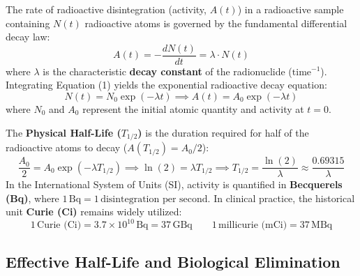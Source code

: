 \documentclass[11pt,a4paper]{article}
\begin{document}
The rate of radioactive disintegration (activity, $A(t)$) in a radioactive sample containing $N(t)$ radioactive atoms is governed by the fundamental differential decay law:
\begin{equation}
    A(t) = -\frac{dN(t)}{dt} = \lambda \cdot N(t)
\end{equation}
where $\lambda$ is the characteristic \textbf{decay constant} of the radionuclide ($\text{time}^{-1}$). Integrating Equation (1) yields the exponential radioactive decay equation:
\begin{equation}
    N(t) = N_0 \exp(-\lambda t) \implies A(t) = A_0 \exp(-\lambda t)
\end{equation}
where $N_0$ and $A_0$ represent the initial atomic quantity and activity at $t = 0$.

The \textbf{Physical Half-Life ($T_{1/2}$)} is the duration required for half of the radioactive atoms to decay ($A(T_{1/2}) = A_0 / 2$):
\begin{equation}
    \frac{A_0}{2} = A_0 \exp(-\lambda T_{1/2}) \implies \ln(2) = \lambda T_{1/2} \implies T_{1/2} = \frac{\ln(2)}{\lambda} \approx \frac{0.69315}{\lambda}
\end{equation}
In the International System of Units (SI), activity is quantified in \textbf{Becquerels (Bq)}, where $1\,\text{Bq} = 1\,\text{disintegration per second}$. In clinical practice, the historical unit \textbf{Curie (Ci)} remains widely utilized:
\begin{equation}
    1\,\text{Curie (Ci)} = 3.7 \times 10^{10}\,\text{Bq} = 37\,\text{GBq} \qquad 1\,\text{millicurie (mCi)} = 37\,\text{MBq}
\end{equation}

\subsection{Effective Half-Life and Biological Elimination}
\end{document}
